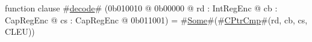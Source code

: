 function clause #\hyperref[sailMIPSzdecode]{decode}# (0b010010 @ 0b00000 @ rd : IntRegEnc @ cb : CapRegEnc @ cs : CapRegEnc @ 0b011001) = #\hyperref[sailMIPSzSome]{Some}#(#\hyperref[sailMIPSzCPtrCmp]{CPtrCmp}#(rd, cb, cs, CLEU))
